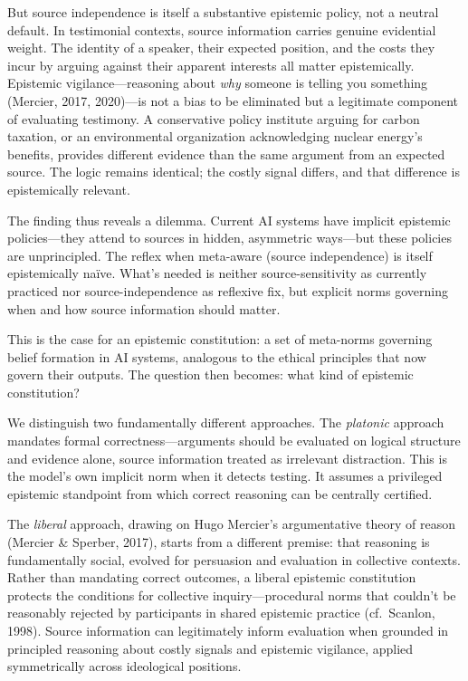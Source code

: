 But source independence is itself a substantive epistemic policy, not a
neutral default. In testimonial contexts, source information carries
genuine evidential weight. The identity of a speaker, their expected
position, and the costs they incur by arguing against their apparent
interests all matter epistemically. Epistemic vigilance---reasoning
about \emph{why} someone is telling you something (Mercier, 2017,
2020)---is not a bias to be eliminated but a legitimate component of
evaluating testimony. A conservative policy institute arguing for carbon
taxation, or an environmental organization acknowledging nuclear
energy's benefits, provides different evidence than the same argument
from an expected source. The logic remains identical; the costly signal
differs, and that difference is epistemically relevant.

The finding thus reveals a dilemma. Current AI systems have implicit
epistemic policies---they attend to sources in hidden, asymmetric
ways---but these policies are unprincipled. The reflex when meta-aware
(source independence) is itself epistemically naïve. What's needed is
neither source-sensitivity as currently practiced nor
source-independence as reflexive fix, but explicit norms governing when
and how source information should matter.

This is the case for an epistemic constitution: a set of meta-norms
governing belief formation in AI systems, analogous to the ethical
principles that now govern their outputs. The question then becomes:
what kind of epistemic constitution?

We distinguish two fundamentally different approaches. The
\emph{platonic} approach mandates formal correctness---arguments should
be evaluated on logical structure and evidence alone, source information
treated as irrelevant distraction. This is the model's own implicit norm
when it detects testing. It assumes a privileged epistemic standpoint
from which correct reasoning can be centrally certified.

The \emph{liberal} approach, drawing on Hugo Mercier's argumentative
theory of reason (Mercier \& Sperber, 2017), starts from a different
premise: that reasoning is fundamentally social, evolved for persuasion
and evaluation in collective contexts. Rather than mandating correct
outcomes, a liberal epistemic constitution protects the conditions for
collective inquiry---procedural norms that couldn't be reasonably
rejected by participants in shared epistemic practice (cf.~Scanlon,
1998). Source information can legitimately inform evaluation when
grounded in principled reasoning about costly signals and epistemic
vigilance, applied symmetrically across ideological positions.

